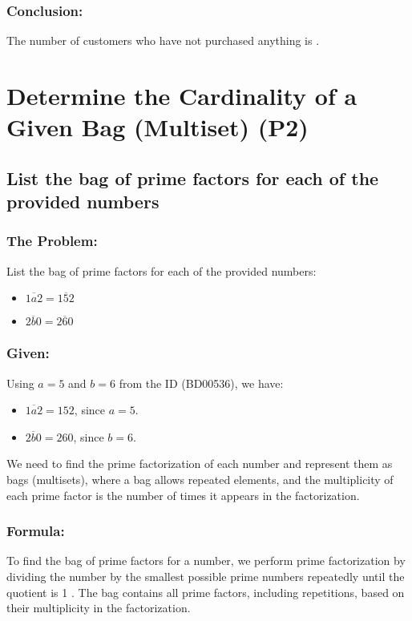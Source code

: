 \documentclass[12pt, a4paper, twoside]{report} %
\begin{document}
\subsubsection*{Conclusion:}
The number of customers who have not purchased anything is .
\section{Determine the Cardinality of a Given Bag (Multiset) (P2)}
\label{sec:P2}

\subsection{List the bag of prime factors for each of the provided numbers}

\subsubsection*{The Problem:}
List the bag of prime factors for each of the provided numbers:
\begin{itemize}
  \item \(\overline{1a2} = \overline{152}\)
  \item \(\overline{2b0} = \overline{260}\)
\end{itemize}

\subsubsection*{Given:}
Using \( a = 5 \) and \( b = 6 \) from the ID (BD00536), we have:
\begin{itemize}
  \item \(\overline{1a2} = 152\), since \( a = 5 \).
  \item \(\overline{2b0} = 260\), since \( b = 6 \).
\end{itemize}
We need to find the prime factorization of each number and represent them as bags (multisets), where a bag allows repeated elements, and the multiplicity of each prime factor is the number of times it appears in the factorization.

\subsubsection*{Formula:}
To find the bag of prime factors for a number, we perform prime factorization by dividing the number by the smallest possible prime numbers repeatedly until the quotient is 1 \cite{burton2010}. The bag contains all prime factors, including repetitions, based on their multiplicity in the factorization.
\end{document}
